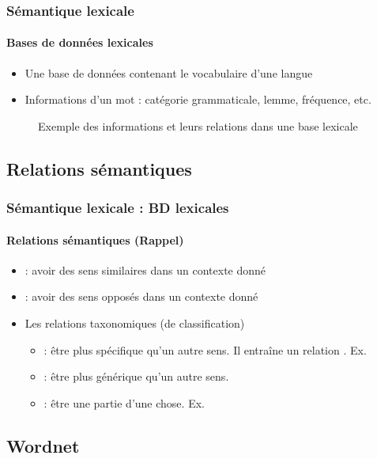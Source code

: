 \documentclass[xcolor=table]{beamer}
\begin{document}
\begin{frame}
	\frametitle{Sémantique lexicale}
	\framesubtitle{Bases de données lexicales}
	
	\begin{itemize}
		\item Une base de données contenant le vocabulaire d'une langue
		\item Informations d'un mot : catégorie grammaticale, lemme, fréquence, etc.
	\end{itemize}

	\begin{figure}
		\centering 
		\caption{Exemple des informations et leurs relations dans une base lexicale \cite{2019-white-al}}
	\end{figure}
	
\end{frame}

\subsection{Relations sémantiques}

\begin{frame}
	\frametitle{Sémantique lexicale : BD lexicales}
	\framesubtitle{Relations sémantiques (Rappel)}
	
	\begin{itemize}
		\item {} : avoir des sens similaires dans un contexte donné
		\item {} : avoir des sens opposés dans un contexte donné
		\item Les relations taxonomiques (de classification)
		\begin{itemize}
			\item {} : être plus spécifique qu'un autre sens. Il entraîne un relation . Ex.  
			\item {} : être plus générique qu'un autre sens. 
			\item {} : être une partie d'une chose. Ex. 
		\end{itemize}
	\end{itemize}
	
\end{frame}

\subsection{Wordnet}
\end{document}
